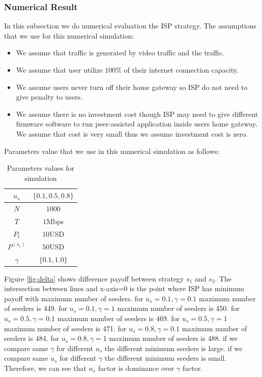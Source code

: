 \documentclass[paper]{ieice}
\begin{document}
\subsubsection{Numerical Result}
In this subsection we do numerical evaluation the ISP strategy.
The assumptions that we use for this numerical simulation:
\begin{itemize}
	\item We assume that  traffic is generated by video traffic and the traffic.
	\item We assume that user utilize $100\%$ of their internet connection capacity.  
	\item We assume users never turn off their home gateway so ISP do not need to give penalty to users.
	\item We assume there is no investment cost though ISP may need to give different firmware software to run peer-assisted application inside users home gateway. We assume that cost is very small thus we assume investment cost is zero.
\end{itemize}
Parameters value that we use in this numerical simulation as follows:
\begin{table}[hb]%
\caption{Parameters values for simulation}
\label{table:1}
\begin{center}
\begin{tabular}{c|c}
\hline
$u_s$ & $\{0.1, 0.5, 0.8\}$ \\
\hline
$N$ & $1000$\\
\hline
$T$ & $1$Mbps \\
\hline
$P_t$ & $10$USD \\
\hline
$P^{(s_1)}$ & $50$USD\\
\hline
$\gamma$ & $\{0.1,1.0\}$ \\
\hline
\end{tabular}
\end{center}
\end{table}

Figure \ref{fig:delta} shows difference payoff between strategy $s_1$ and $s_2$.
The intersection between lines and x-axis=0 is the point where ISP has minimum payoff with maximum number of seeders.
for $u_s=0.1, \gamma=0.1$ maximum number of seeders is 449.  
for $u_s=0.1, \gamma=1$ maximum number of seeders is 450. 
for $u_s=0.5, \gamma=0.1$ maximum number of seeders is 469.  
for $u_s=0.5, \gamma=1$ maximum number of seeders is 471. 
for $u_s=0.8, \gamma=0.1$ maximum number of seeders is 484.  
for $u_s=0.8, \gamma=1$ maximum number of seeders is 488.
 if we compare same $\gamma$ for different $u_s$ the different minimum seeders is large.  
if we compare same $u_s$ for different $\gamma$ the different minimum seeders is small.   
Therefore, we can see that $u_s$ factor is dominance over $\gamma$ factor. 
\end{document}
